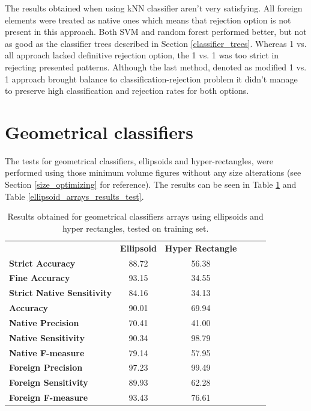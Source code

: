 The results obtained when using kNN classifier aren't very satisfying. All foreign elements were treated as native ones which means that rejection option is not present in this approach. Both SVM and random forest performed better, but not as good as the classifier trees described in Section \ref{classifier_trees}. Whereas 1 vs. all approach lacked definitive rejection option, the 1 vs. 1 was too strict in rejecting presented patterns. Although the last method, denoted as modified 1 vs. 1 approach brought balance to classification-rejection problem it didn't manage to preserve high classification and rejection rates for both options.

\section{Geometrical classifiers}

The tests for geometrical classifiers, ellipsoids and hyper-rectangles, were performed using those minimum volume figures without any size alterations (see Section \ref{size_optimizing} for reference). The results can be seen in Table \ref{ellipsoid_arrays_results_training} and Table \ref{ellipsoid_arrays_results_test}.

\begin{table}[htp]
	\centering
	\caption{Results obtained for geometrical classifiers arrays using ellipsoids and hyper rectangles, tested on training set.}
	\label{ellipsoid_arrays_results_training}
	\begin{tabular}{l|c|c|lll}
		\cline{2-3}
		& \multicolumn{1}{l|}{\textbf{Ellipsoid}} & \textbf{Hyper Rectangle}  &  &  \\ \cline{1-3}
		\multicolumn{1}{|l|}{\textbf{Strict Accuracy}}           & 88.72 & 56.38 \\ \cline{1-3}
		\multicolumn{1}{|l|}{\textbf{Fine Accuracy}}             & 93.15 & 34.55 \\ \cline{1-3}
		\multicolumn{1}{|l|}{\textbf{Strict Native Sensitivity}} & 84.16 & 34.13 \\ \cline{1-3}
		\multicolumn{1}{|l|}{\textbf{Accuracy}}                  & 90.01 & 69.94 \\ \cline{1-3}
		\multicolumn{1}{|l|}{\textbf{Native Precision}}          & 70.41 & 41.00 \\ \cline{1-3}
		\multicolumn{1}{|l|}{\textbf{Native Sensitivity}}        & 90.34 & 98.79 \\ \cline{1-3}
		\multicolumn{1}{|l|}{\textbf{Native F-measure}}          & 79.14 & 57.95 \\ \cline{1-3}
		\multicolumn{1}{|l|}{\textbf{Foreign Precision}}         & 97.23 & 99.49 \\ \cline{1-3}
		\multicolumn{1}{|l|}{\textbf{Foreign Sensitivity}}       & 89.93 & 62.28 \\ \cline{1-3}
		\multicolumn{1}{|l|}{\textbf{Foreign F-measure}}         & 93.43 & 76.61 \\ \cline{1-3}
	\end{tabular}
\end{table}

